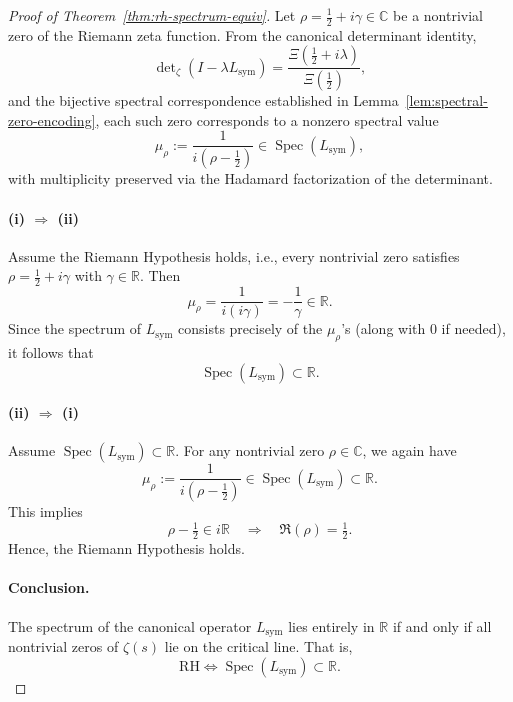 \begin{proof}[Proof of Theorem~\ref{thm:rh-spectrum-equiv}]
Let \( \rho = \tfrac{1}{2} + i\gamma \in \mathbb{C} \) be a nontrivial zero of the Riemann zeta function. From the canonical determinant identity,
\[
\det\nolimits_\zeta(I - \lambda L_{\mathrm{sym}}) = \frac{\Xi\left( \tfrac{1}{2} + i\lambda \right)}{\Xi\left( \tfrac{1}{2} \right)},
\]
and the bijective spectral correspondence established in Lemma~\ref{lem:spectral-zero-encoding}, each such zero corresponds to a nonzero spectral value
\[
\mu_\rho := \frac{1}{i(\rho - \tfrac{1}{2})} \in \operatorname{Spec}(L_{\mathrm{sym}}),
\]
with multiplicity preserved via the Hadamard factorization of the determinant.

\paragraph{(i) \( \Rightarrow \) (ii)}
Assume the Riemann Hypothesis holds, i.e., every nontrivial zero satisfies \( \rho = \tfrac{1}{2} + i\gamma \) with \( \gamma \in \mathbb{R} \). Then
\[
\mu_\rho = \frac{1}{i(i\gamma)} = -\frac{1}{\gamma} \in \mathbb{R}.
\]
Since the spectrum of \( L_{\mathrm{sym}} \) consists precisely of the \( \mu_\rho \)'s (along with 0 if needed), it follows that
\[
\operatorname{Spec}(L_{\mathrm{sym}}) \subset \mathbb{R}.
\]

\paragraph{(ii) \( \Rightarrow \) (i)}
Assume \( \operatorname{Spec}(L_{\mathrm{sym}}) \subset \mathbb{R} \). For any nontrivial zero \( \rho \in \mathbb{C} \), we again have
\[
\mu_\rho := \frac{1}{i(\rho - \tfrac{1}{2})} \in \operatorname{Spec}(L_{\mathrm{sym}}) \subset \mathbb{R}.
\]
This implies
\[
\rho - \tfrac{1}{2} \in i\mathbb{R} \quad \Longrightarrow \quad \Re(\rho) = \tfrac{1}{2}.
\]
Hence, the Riemann Hypothesis holds.

\paragraph{Conclusion.}
The spectrum of the canonical operator \( L_{\mathrm{sym}} \) lies entirely in \( \mathbb{R} \) if and only if all nontrivial zeros of \( \zeta(s) \) lie on the critical line. That is,
\[
\mathrm{RH} \iff \operatorname{Spec}(L_{\mathrm{sym}}) \subset \mathbb{R}.
\]
\end{proof}

